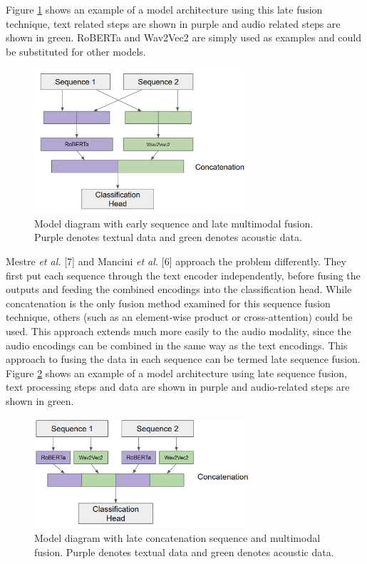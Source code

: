 \documentclass[twocolumn,twoside]{article}
\begin{document}
Figure \ref{fig:model-diag-early} shows an example of a model
architecture using this late fusion technique, text related steps are
shown in purple and audio related steps are shown in green. RoBERTa and
Wav2Vec2 are simply used as examples and could be substituted for other
models.

\begin{figure}[h]
\centering
\includegraphics[width=8cm]{model-diag-early}
\caption{Model diagram with early sequence and late multimodal fusion. Purple denotes textual data and green denotes acoustic data.\label{fig:model-diag-early}}
\end{figure}

Mestre \emph{et al.} {[}7{]} and Mancini \emph{et al.} {[}6{]} approach
the problem differently. They first put each sequence through the text
encoder independently, before fusing the outputs and feeding the
combined encodings into the classification head. While concatenation is
the only fusion method examined for this sequence fusion technique,
others (such as an element-wise product or cross-attention) could be
used. This approach extends much more easily to the audio modality,
since the audio encodings can be combined in the same way as the text
encodings. This approach to fusing the data in each sequence can be
termed late sequence fusion. Figure \ref{fig:model-diag-late} shows an
example of a model architecture using late sequence fusion, text
processing steps and data are shown in purple and audio-related steps
are shown in green.

\begin{figure}[h]
\centering
\includegraphics[width=8cm]{model-diag-late}
\caption{Model diagram with late concatenation sequence and multimodal fusion. Purple denotes textual data and green denotes acoustic data.\label{fig:model-diag-late}}
\end{figure}
\end{document}
